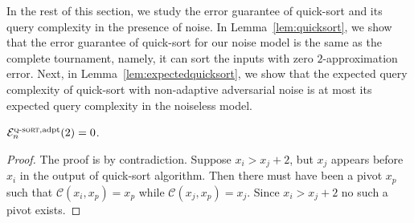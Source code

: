 \documentclass[twoside,11pt]{article}
\newcommand{\cC}{\mathcal{C}}
\newcommand{\cE}{\mathcal{E}}
\newcommand{\algorithms}[1]{\textsc{#1}}
\newcommand{\algquicksort}{\algorithms{q-sort}}
\newcommand{\pe}{\cE}
\newcommand{\adaptive}{\textnormal{adpt}}
\begin{document}
In the rest of this section, we study the error guarantee of quick-sort
and its query complexity in the presence of noise. In
Lemma~\ref{lem:quicksort}, we show that the error guarantee of
quick-sort for our noise model is the same as the complete tournament, namely, 
it can sort the inputs with zero $2$-approximation error. Next, in
Lemma~\ref{lem:expectedquicksort}, we show that the expected query
complexity of quick-sort with non-adaptive adversarial noise is at
most its expected query complexity in the noiseless model.

\begin{lemma}
 \label{lem:quicksort}
  $\pe_n^{\algquicksort,\adaptive}(2)=0$.
\end{lemma}
\begin{proof}
 The proof is by contradiction. Suppose $x_i>x_j+2$, but $x_j$ appears
 before $x_i$ in the output of quick-sort algorithm. Then there must
 have been a pivot $x_p$ such that $\cC(x_i,x_p)=x_p$ while
 $\cC(x_j,x_p)=x_j$. Since $x_i>x_j+2$ no such a pivot exists.
\end{proof}
\end{document}
